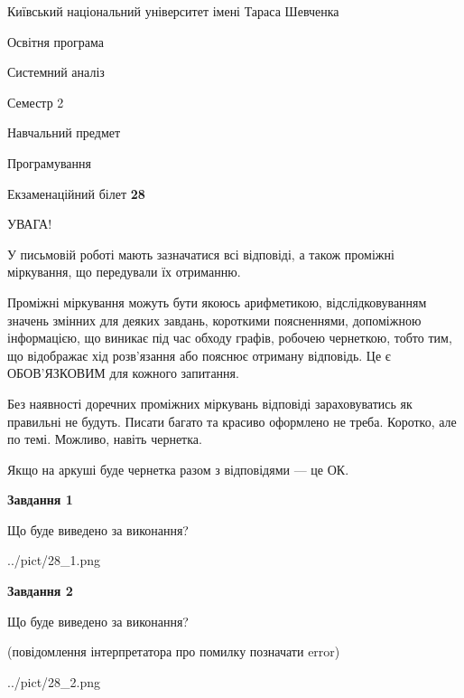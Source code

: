 \documentclass[12pt, ukrainian]{article}
\begin{document}
{{\begin {small}\par
{ \center  Київський національний університет імені Тараса Шевченка \par}
{\parbox {5 cm}{Освітня програма \hfill}{\parbox {7 cm}{Системний аналіз \hfill}}\parbox {6 cm}{\hfill Семестр 2}}\par
{\parbox {5 cm} {Навчальний предмет \hfill}\parbox {7 cm}{Програмування \hfill}\parbox {6cm}{\hfill}\par}\vspace{-7pt} \end{small}}{\center Екзаменаційний білет \No \textbf
{ 28 }\par}}
{
\begin {large}
УВАГА!

У письмовій роботі мають зазначатися всі відповіді, а також проміжні міркування, що передували їх отриманню.

Проміжні міркування можуть бути якоюсь арифметикою, відслідковуванням зна\-чень змінних для деяких завдань,
короткими поясненнями, допоміжною інформацією, що виникає під час обходу графів, робочею чернеткою,
тобто тим, що відображає хід розв’язання або пояснює отриману відповідь.
Це є ОБОВ’ЯЗКОВИМ для кожного запитання.

Без наявності доречних проміжних міркувань відповіді зараховуватись як правиль\-ні не будуть.
Писати багато та красиво оформлено не треба. Коротко, але по темі. Можли\-во, навіть чернетка.

Якщо на аркуші буде чернетка разом з відповідями --- це ОК.

\newpage

{\begin {center}\textbf{Завдання 1}\end {center}}\par
Що буде виведено за виконання?\par
\begin{center}
	{../pict/28_1.png}
\end{center}
\newpage

{\begin {center}\textbf{Завдання 2}\end {center}}\par
Що буде виведено за виконання?\par
 (повідомлення інтерпретатора про помилку позначати error)\par
\begin{center}
	{../pict/28_2.png}
\end{center}
\newpage


\end{large}}
\end{document}
